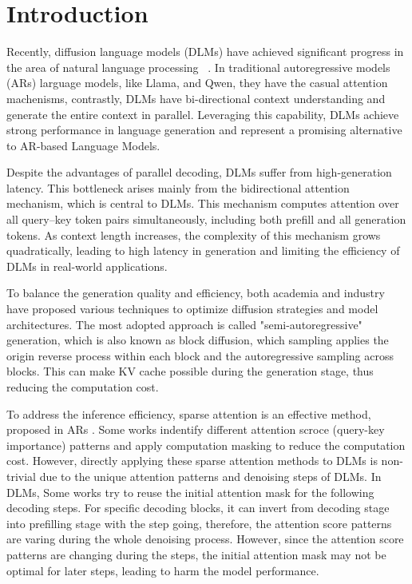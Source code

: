 \section{Introduction}

Recently, diffusion language models (DLMs) have achieved significant progress in
the area of natural language processing ~\cite{nie2025large,bie2025llada2,ye2025dream}.
In traditional autoregressive models (ARs) larguage models, like Llama, and Qwen,
they have the casual attention machenisms, contrastly, DLMs have bi-directional context
understanding and generate the entire context in parallel. Leveraging this
capability, DLMs achieve strong performance in language generation and represent
a promising alternative to AR-based Language Models.

Despite the advantages of parallel decoding, DLMs suffer from high-generation
latency. This bottleneck arises mainly from the bidirectional attention mechanism,
which is central to DLMs. This mechanism computes attention over all query–key token
pairs simultaneously, including both prefill and all generation tokens. As context
length increases, the complexity of this mechanism grows quadratically, leading to
high latency in generation and limiting the efficiency of DLMs in real-world applications.

To balance the generation quality and efficiency, both academia and industry
have proposed various techniques to optimize diffusion strategies and model
architectures. The most adopted approach is called "semi-autoregressive" generation,
which is also known as block diffusion, which sampling applies the origin reverse
process within each block and the autoregressive sampling across blocks. This can make 
KV cache possible during the generation stage, thus reducing the computation cost. \cite{fastdllm}

To address the inference efficiency, sparse attention is an effective method, proposed
in ARs \cite{jiang2024minference}. Some works indentify different attention
scroce (query-key importance) patterns and apply computation masking to reduce
the computation cost. However, directly applying these sparse attention methods
to DLMs is non-trivial due to the unique attention patterns and denoising steps
of DLMs. In DLMs, Some works \cite{wang2025sparsed} try to reuse the initial
attention mask for the following decoding steps. For specific decoding blocks,
it can invert from decoding stage into prefilling stage with the step going, therefore,
the attention score patterns are varing during the whole denoising process. However,
since the attention score patterns are changing during the steps, the initial
attention mask may not be optimal for later steps, leading to harm the model performance.


